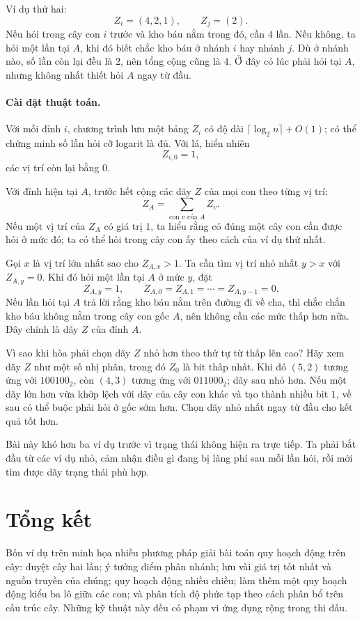 \documentclass[11pt]{article}
\begin{document}
Ví dụ thứ hai:
\[
  Z_i=(4,2,1),\qquad Z_j=(2).
\]
Nếu hỏi trong cây con \(i\) trước và kho báu nằm trong đó, cần \(4\) lần. Nếu
không, ta hỏi một lần tại \(A\), khi đó biết chắc kho báu ở nhánh \(i\) hay
nhánh \(j\). Dù ở nhánh nào, số lần còn lại đều là \(2\), nên tổng cộng cũng
là \(4\). Ở đây có lúc phải hỏi tại \(A\), nhưng không nhất thiết hỏi \(A\)
ngay từ đầu.

\paragraph{Cài đặt thuật toán.}
Với mỗi đỉnh \(i\), chương trình lưu một bảng \(Z_i\) có độ dài
\(\lceil\log_2 n\rceil+O(1)\); có thể chứng minh số lần hỏi cỡ logarit là đủ.
Với lá, hiển nhiên
\[
  Z_{i,0}=1,
\]
các vị trí còn lại bằng \(0\).

Với đỉnh hiện tại \(A\), trước hết cộng các dãy \(Z\) của mọi con theo từng
vị trí:
\[
  Z_A=\sum_{\text{con }v\text{ của }A} Z_v.
\]
Nếu một vị trí của \(Z_A\) có giá trị \(1\), ta hiểu rằng có đúng một cây con
cần được hỏi ở mức đó; ta có thể hỏi trong cây con ấy theo cách của ví dụ
thứ nhất.

Gọi \(x\) là vị trí lớn nhất sao cho \(Z_{A,x}>1\). Ta cần tìm vị trí nhỏ
nhất \(y>x\) với \(Z_{A,y}=0\). Khi đó hỏi một lần tại \(A\) ở mức \(y\), đặt
\[
  Z_{A,y}=1,\qquad Z_{A,0}=Z_{A,1}=\cdots=Z_{A,y-1}=0.
\]
Nếu lần hỏi tại \(A\) trả lời rằng kho báu nằm trên đường đi về cha, thì chắc
chắn kho báu không nằm trong cây con gốc \(A\), nên không cần các mức thấp
hơn nữa. Đây chính là dãy \(Z\) của đỉnh \(A\).

Vì sao khi hòa phải chọn dãy \(Z\) nhỏ hơn theo thứ tự từ thấp lên cao? Hãy
xem dãy \(Z\) như một số nhị phân, trong đó \(Z_0\) là bit thấp nhất. Khi đó
\((5,2)\) tương ứng với \(100100_2\), còn \((4,3)\) tương ứng với
\(011000_2\); dãy sau nhỏ hơn. Nếu một dãy lớn hơn vừa khớp lệch với dãy của
cây con khác và tạo thành nhiều bit \(1\), về sau có thể buộc phải hỏi ở gốc
sớm hơn. Chọn dãy nhỏ nhất ngay từ đầu cho kết quả tốt hơn.

Bài này khó hơn ba ví dụ trước vì trạng thái không hiện ra trực tiếp. Ta phải
bắt đầu từ các ví dụ nhỏ, cảm nhận điều gì đang bị lãng phí sau mỗi lần hỏi,
rồi mới tìm được dãy trạng thái phù hợp.

\section{Tổng kết}

Bốn ví dụ trên minh họa nhiều phương pháp giải bài toán quy hoạch động trên
cây: duyệt cây hai lần; ý tưởng điểm phân nhánh; lưu vài giá trị tốt nhất và
nguồn truyền của chúng; quy hoạch động nhiều chiều; làm thêm một quy hoạch
động kiểu ba lô giữa các con; và phân tích độ phức tạp theo cách phân bổ trên
cấu trúc cây. Những kỹ thuật này đều có phạm vi ứng dụng rộng trong thi đấu.
\end{document}
